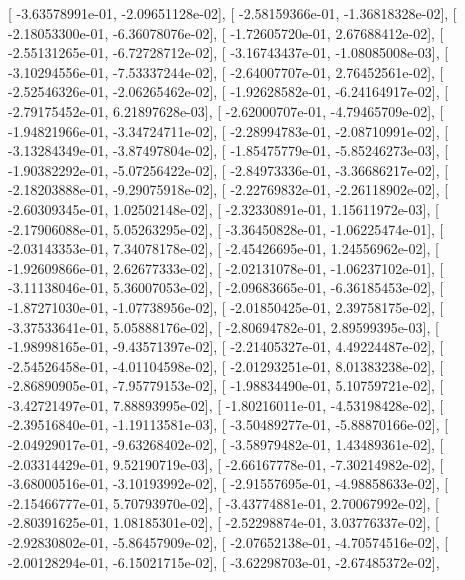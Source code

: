 \documentclass{article}
\begin{document}
       [ -3.63578991e-01,  -2.09651128e-02],
       [ -2.58159366e-01,  -1.36818328e-02],
       [ -2.18053300e-01,  -6.36078076e-02],
       [ -1.72605720e-01,   2.67688412e-02],
       [ -2.55131265e-01,  -6.72728712e-02],
       [ -3.16743437e-01,  -1.08085008e-03],
       [ -3.10294556e-01,  -7.53337244e-02],
       [ -2.64007707e-01,   2.76452561e-02],
       [ -2.52546326e-01,  -2.06265462e-02],
       [ -1.92628582e-01,  -6.24164917e-02],
       [ -2.79175452e-01,   6.21897628e-03],
       [ -2.62000707e-01,  -4.79465709e-02],
       [ -1.94821966e-01,  -3.34724711e-02],
       [ -2.28994783e-01,  -2.08710991e-02],
       [ -3.13284349e-01,  -3.87497804e-02],
       [ -1.85475779e-01,  -5.85246273e-03],
       [ -1.90382292e-01,  -5.07256422e-02],
       [ -2.84973336e-01,  -3.36686217e-02],
       [ -2.18203888e-01,  -9.29075918e-02],
       [ -2.22769832e-01,  -2.26118902e-02],
       [ -2.60309345e-01,   1.02502148e-02],
       [ -2.32330891e-01,   1.15611972e-03],
       [ -2.17906088e-01,   5.05263295e-02],
       [ -3.36450828e-01,  -1.06225474e-01],
       [ -2.03143353e-01,   7.34078178e-02],
       [ -2.45426695e-01,   1.24556962e-02],
       [ -1.92609866e-01,   2.62677333e-02],
       [ -2.02131078e-01,  -1.06237102e-01],
       [ -3.11138046e-01,   5.36007053e-02],
       [ -2.09683665e-01,  -6.36185453e-02],
       [ -1.87271030e-01,  -1.07738956e-02],
       [ -2.01850425e-01,   2.39758175e-02],
       [ -3.37533641e-01,   5.05888176e-02],
       [ -2.80694782e-01,   2.89599395e-03],
       [ -1.98998165e-01,  -9.43571397e-02],
       [ -2.21405327e-01,   4.49224487e-02],
       [ -2.54526458e-01,  -4.01104598e-02],
       [ -2.01293251e-01,   8.01383238e-02],
       [ -2.86890905e-01,  -7.95779153e-02],
       [ -1.98834490e-01,   5.10759721e-02],
       [ -3.42721497e-01,   7.88893995e-02],
       [ -1.80216011e-01,  -4.53198428e-02],
       [ -2.39516840e-01,  -1.19113581e-03],
       [ -3.50489277e-01,  -5.88870166e-02],
       [ -2.04929017e-01,  -9.63268402e-02],
       [ -3.58979482e-01,   1.43489361e-02],
       [ -2.03314429e-01,   9.52190719e-03],
       [ -2.66167778e-01,  -7.30214982e-02],
       [ -3.68000516e-01,  -3.10193992e-02],
       [ -2.91557695e-01,  -4.98858633e-02],
       [ -2.15466777e-01,   5.70793970e-02],
       [ -3.43774881e-01,   2.70067992e-02],
       [ -2.80391625e-01,   1.08185301e-02],
       [ -2.52298874e-01,   3.03776337e-02],
       [ -2.92830802e-01,  -5.86457909e-02],
       [ -2.07652138e-01,  -4.70574516e-02],
       [ -2.00128294e-01,  -6.15021715e-02],
       [ -3.62298703e-01,  -2.67485372e-02],
\end{document}
